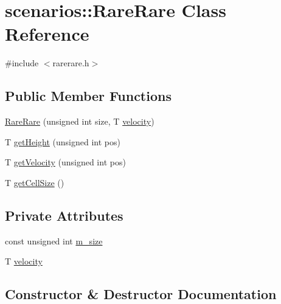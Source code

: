 \hypertarget{classscenarios_1_1RareRare}{}\section{scenarios\+:\+:Rare\+Rare Class Reference}
\label{classscenarios_1_1RareRare}


{\ttfamily \#include $<$rarerare.\+h$>$}

\subsection*{Public Member Functions}
\begin{DoxyCompactItemize}
\item 
\hyperlink{classscenarios_1_1RareRare_a89d6f8fd5b4054f33b822403d468d6ee}{Rare\+Rare} (unsigned int size, T \hyperlink{classscenarios_1_1RareRare_ab8875c7912fe38818bac7a20d229adc4}{velocity})
\item 
T \hyperlink{classscenarios_1_1RareRare_aea0f583a4ee86dd74d4b0bac32877fc8}{get\+Height} (unsigned int pos)
\item 
T \hyperlink{classscenarios_1_1RareRare_abeaedfee3a1c453811150320ce213efe}{get\+Velocity} (unsigned int pos)
\item 
T \hyperlink{classscenarios_1_1RareRare_a228b969ccfcaa05c24dc45114f3b7381}{get\+Cell\+Size} ()
\end{DoxyCompactItemize}
\subsection*{Private Attributes}
\begin{DoxyCompactItemize}
\item 
const unsigned int \hyperlink{classscenarios_1_1RareRare_af3da3b4222932903633bb7fc7c5f2c29}{m\+\_\+size}
\item 
T \hyperlink{classscenarios_1_1RareRare_ab8875c7912fe38818bac7a20d229adc4}{velocity}
\end{DoxyCompactItemize}


\subsection{Constructor \& Destructor Documentation}
\hypertarget{classscenarios_1_1RareRare_a89d6f8fd5b4054f33b822403d468d6ee}{}
